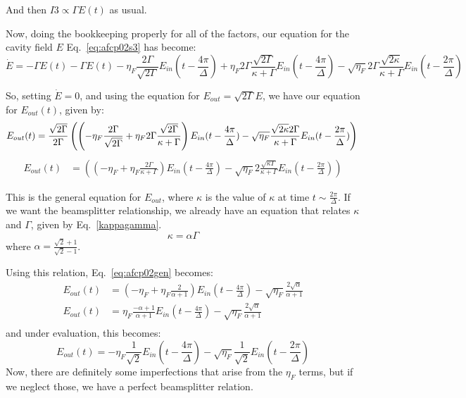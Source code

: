 \documentclass[12pt]{article}
\begin{document}
And then $I3 \propto \Gamma E(t)$ as usual.

Now, doing the bookkeeping properly for all of the factors, our equation for the cavity field $E$ Eq.~\eqref{eq:afcp02s3} has become:
\begin{equation}
\dot{E}= -\Gamma E(t) -\Gamma E(t)-\eta_F \frac{ 2 \Gamma}{\sqrt{2 \Gamma}} E_{in}(t -\frac{ 4 \pi}{\Delta}) +\eta_F 2 \Gamma \frac{\sqrt{2 \Gamma}}{\kappa+\Gamma}E_{in}(t-\frac{4\pi}{\Delta}) -\sqrt{\eta_F} 2 \Gamma \frac{\sqrt{2\kappa}}{\kappa+\Gamma} E_{in}(t-\frac{2 \pi}{\Delta})
\end{equation}

So, setting $\dot{E}=0$, and using the equation for $E_{out} = \sqrt{2\Gamma}E$, we have our equation for $E_{out}(t)$, given by:
\begin{equation}
E_{out}(t) =\frac{\sqrt{2\Gamma}}{2 \Gamma}\left( \left(-\eta_F \frac{2 \Gamma}{\sqrt{2\Gamma}}+\eta_F 2 \Gamma \frac{\sqrt{2 \Gamma}}{\kappa+\Gamma} \right ) E_{in}(t-\frac{ 4 \pi}{\Delta} )-\sqrt{\eta_F} \frac{\sqrt{2 \kappa}2\Gamma}{\kappa+\Gamma}E_{in}(t-\frac{2 \pi}{\Delta}) \right)\\
\end{equation}
\begin{align}
\label{eq:afcp02gen}
E_{out}(t) &= \left ( \left(-\eta_F +\eta_F\frac{2 \Gamma}{\kappa+\Gamma}\right) E_{in}(t-\frac{4 \pi}{\Delta})-\sqrt{\eta_F}2\frac{\sqrt{\kappa\Gamma}}{\kappa+\Gamma}E_{in}(t-\frac{2 \pi}{\Delta})\right)
\end{align}

This is the general equation for $E_{out}$, where $\kappa$ is the value of $\kappa$ at time $t\sim \frac{2 \pi}{\Delta}$. If we want the beamsplitter relationship, we already have an equation that relates $\kappa$ and $\Gamma$, given by Eq.~\eqref{kappagamma}.
\begin{equation}
\kappa = \alpha \Gamma
\end{equation}
where $\alpha = \frac{ \sqrt{2} +1}{\sqrt{2} -1}$.

Using this relation, Eq.~\eqref{eq:afcp02gen} becomes:
\begin{align}
E_{out}(t) &= \left ( -\eta_F + \eta_F \frac{2}{\alpha+1}\right)E_{in}(t-\frac{4 \pi}{\Delta}) - \sqrt{\eta_F}\frac{2\sqrt{\alpha}}{\alpha+1}\\
E_{out}(t) &= \eta_F\frac{-\alpha+1}{\alpha+1}E_{in}(t-\frac{4 \pi}{\Delta}) - \sqrt{\eta_F}\frac{2\sqrt{\alpha}}{\alpha+1}\\
\end{align}
and under evaluation, this becomes:
\begin{equation}
E_{out}(t) = -\eta_F\frac{1}{\sqrt{2}}E_{in}(t-\frac{4\pi}{\Delta}) - \sqrt{\eta_F}\frac{1}{\sqrt{2}}E_{in}(t-\frac{2 \pi}{\Delta})
\end{equation}
Now, there are definitely some imperfections that arise from the $\eta_F$ terms, but if we neglect those,
we have a perfect beamsplitter relation.
\end{document}
